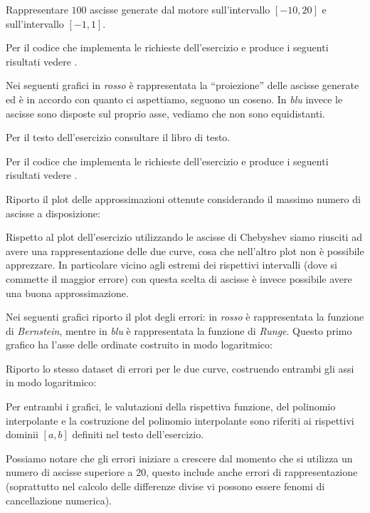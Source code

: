 \begin{exercise}
Rappresentare $100$ ascisse generate dal motore
 sull'intervallo $[-10, 20]$ e
sull'intervallo $[-1, 1]$.
\end{exercise}
Per il codice che implementa le richieste dell'esercizio e produce i seguenti
risultati vedere .

Nei seguenti grafici in
\emph{rosso} \`e rappresentata la ``proiezione'' delle ascisse generate ed \`e
in accordo con quanto ci aspettiamo, seguono un coseno. In \emph{blu} invece le
ascisse sono disposte sul proprio asse, vediamo che non sono equidistanti.
\begin{center}   

\end{center}
\begin{center}   

\end{center}

\begin{exercise}[4.15]
Per il testo dell'esercizio consultare il libro di testo.
\end{exercise}
Per il codice che implementa le richieste dell'esercizio e produce i seguenti
risultati vedere .

Riporto il plot delle approssimazioni ottenute considerando il massimo numero di
ascisse a disposizione:
\begin{center}  

\end{center}
Rispetto al plot dell'esercizio  utilizzando le
ascisse di Chebyshev siamo riusciti ad avere una rappresentazione delle due
curve, cosa che nell'altro plot non \`e possibile apprezzare. In particolare
vicino agli estremi dei rispettivi intervalli (dove si commette il maggior
errore) con questa scelta di ascisse \`e invece possibile avere una buona
approssimazione.

Nei seguenti grafici riporto il plot degli errori: in
\emph{rosso} \`e rappresentata la funzione di \emph{Bernstein}, mentre in 
\emph{blu} \`e rappresentata la funzione di \emph{Runge}. Questo primo grafico
ha l'asse delle ordinate costruito in modo logaritmico:
\begin{center}   

\end{center}
Riporto lo stesso dataset di errori per le due curve, costruendo entrambi gli
assi in modo logaritmico:
\begin{center}  

\end{center}
Per entrambi i grafici, le valutazioni della rispettiva funzione, del polinomio
interpolante e la costruzione del polinomio interpolante sono riferiti ai
rispettivi dominii $[a,b]$ definiti nel testo dell'esercizio. 

Possiamo notare che gli errori iniziare a crescere dal momento che si utilizza
un numero di ascisse superiore a 20, questo include anche errori di
rappresentazione (soprattutto nel calcolo delle differenze divise vi possono
essere fenomi di cancellazione numerica).
